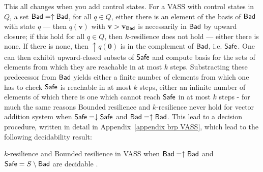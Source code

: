 This all changes when you add control states. For a VASS with control states in $Q$, a set $\textsf{Bad} = \uparrow \textsf{Bad}$, for all $q \in Q$, either there is an element of the basis of $\textsf{Bad}$ with state $q$ \----
then $q(\textbf{v})$ with $\textbf{v} > \textbf{v}_{\textsf{Bad}}$ is necessarily in $\textsf{Bad}$ by upward closure; if this hold for all $q \in Q$, then $k$-resilience does not hold \---- either there is none. If there is none, then 
$\uparrow q(\textbf{0})$
 is in the complement of $\textsf{Bad}$, i.e. $\textsf{Safe}$. One can then exhibit upward-closed subsets of 
 $\textsf{Safe}$ and compute basis for the sets of elements from which they are reachable in at most $k$ steps. 
Substracting these predecessor from $\textsf{Bad}$ yields either a finite number of elements from which one has to check $\textsf{Safe}$ is reachable in at most $k$ steps, either an infinite number of elements of which there is one which cannot reach $\textsf{Safe}$ in at most $k$ steps \-- for much the same reasons {\sc Bounded resilience} and {\sc $k$-resilience} never hold for vector addition system when $\textsf{Safe} = \downarrow \textsf{Safe}$ and $\textsf{Bad} = \uparrow \textsf{Bad}$. This lead to a decision procedure, written in detail in Appendix~\ref{appendix brp VASS}, which lead to the following decidability result:

\begin{theorem}\label{brp VASS}
{\sc $k$-resilience }  and {\sc Bounded resilience} in VASS when $\textsf{Bad} = \uparrow \textsf{Bad}$ and $\textsf{Safe} = S \setminus \textsf{Bad}$ are decidable%
.
\end{theorem}













